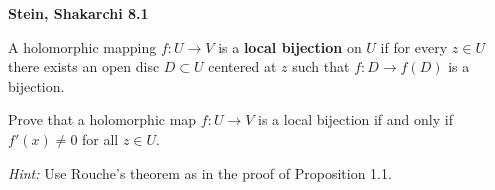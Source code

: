 \textbf{Stein, Shakarchi 8.1}

A holomorphic mapping $f: U \to V$ is a \textbf{local bijection} on $U$ if for every $z \in U$ there exists an open disc
$D \subset U$ centered at $z$ such that $f: D \to f(D)$ is a bijection.

Prove that a holomorphic map $f : U \to V$ is a local bijection if and only if $f'(x) \neq 0$ for all $z \in U$.

\textit{Hint:} Use Rouche's theorem as in the proof of Proposition 1.1.

\begin{solution}
  \ \\
\end{solution}
